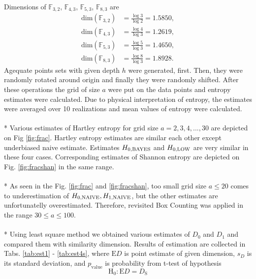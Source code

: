 \documentclass[a4paper,10pt]{article}
\begin{document}
Dimensions of $\mathbb{F}_{3,2}$, $\mathbb{F}_{4,3}$, $\mathbb{F}_{5,3}$, $\mathbb{F}_{8,3}$ are
\begin{equation} 
\label{eq:fracdim}
\begin{split}
\text{dim}(\mathbb{F}_{3,2}) & = \frac{\log{3}}{\log{2}} = 1.5850, \\
\text{dim}(\mathbb{F}_{4,3}) & = \frac{\log{4}}{\log{3}} = 1.2619, \\
\text{dim}(\mathbb{F}_{5,3}) & = \frac{\log{5}}{\log{3}} = 1.4650, \\
\text{dim}(\mathbb{F}_{8,3}) & = \frac{\log{8}}{\log{3}} = 1.8928.
\end{split}
\end{equation}
Agequate points sets with given depth $h$ were generated, first. Then, they were randomly rotated around origin and finally they were randomly shifted. After these operations the grid of size $a$ were put on the data points and entropy estimates were calculated. Due to physical interpretation of entropy, the estimates were averaged over 10 realizations and mean values of entropy were calculated. \\
\\*
Various estimates of Hartley entropy for grid size $a=2,3,4,...,30$ are depicted on Fig \ref{fig:frac}. Hartley entropy estimates are similar each other except underbiased naive estimate. Estimates $H_{0,\mbox{\scriptsize{BAYES}}}$ and $H_{0,\mbox{\scriptsize{LOW}}}$ are very similar in these four cases. Corresponding estimates of Shannon entropy are depicted on Fig. \ref{fig:fracshan} in the same range. \\
\\*
As seen in the Fig. \ref{fig:frac} and \ref{fig:fracshan}, too small grid size $a \leq 20$ comes to underestimation of $H_{0,\mbox{\scriptsize{NAIVE}}}, H_{1,\mbox{\scriptsize{NAIVE}}}$, but the other estimates are unfortunatelly overestimated. Therefore, revisited Box Counting was applied in the range $30 \leq a \leq 100$.\\
\\*
Using least square method we obtained various estimates of $D_{0}$ and $D_{1}$ and compared them with similarity dimension. Results of estimation are collected in Tabs. \ref{tab:est1} - \ref{tab:est4s}, where $\text{E}D$ is point estimate of given dimension, $s_{D}$ is its standard deviation, and $p_{\text{value}}$ is probability from t-test of hypothesis
\begin{equation} 
\label{eq:hypo}
\text{H}_{0} : \text{E}D = D_{\text{S}}
\end{equation}
\end{document}
